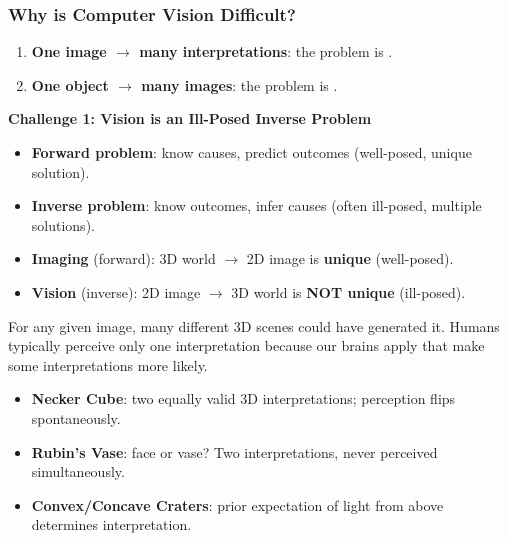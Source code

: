 \bigseparator

\subsubsection{Why is Computer Vision Difficult?}

\begin{thmbox}
\begin{enumerate}
  \item \textbf{One image $\rightarrow$ many interpretations}: the problem is .
  \item \textbf{One object $\rightarrow$ many images}: the problem is .
\end{enumerate}
\end{thmbox}

\separator

\textbf{Challenge 1: Vision is an Ill-Posed Inverse Problem}

\begin{defbox}
\begin{itemize}
  \item \textbf{Forward problem}: know causes, predict outcomes (well-posed, unique solution).
  \item \textbf{Inverse problem}: know outcomes, infer causes (often ill-posed, multiple solutions).
\end{itemize}
\end{defbox}

\begin{itemize}
  \item \textbf{Imaging} (forward): 3D world $\rightarrow$ 2D image is \textbf{unique} (well-posed).
  \item \textbf{Vision} (inverse): 2D image $\rightarrow$ 3D world is \textbf{NOT unique} (ill-posed).
\end{itemize}

For any given image, many different 3D scenes could have generated it. Humans typically perceive only one interpretation because our brains apply  that make some interpretations more likely.

\begin{exbox}
\begin{itemize}
  \item \textbf{Necker Cube}: two equally valid 3D interpretations; perception flips spontaneously.
  \item \textbf{Rubin's Vase}: face or vase? Two interpretations, never perceived simultaneously.
  \item \textbf{Convex/Concave Craters}: prior expectation of light from above determines interpretation.
\end{itemize}
\end{exbox}

